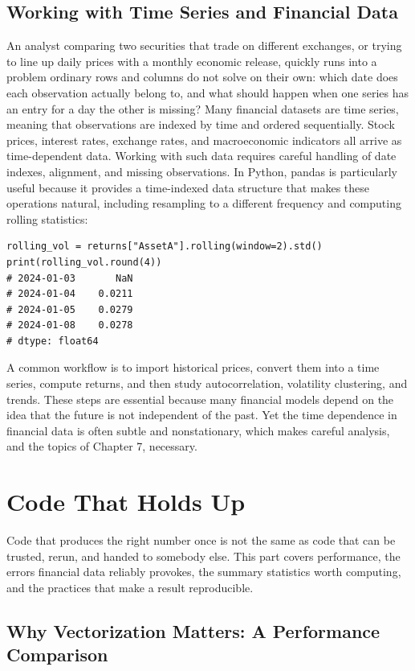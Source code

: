 \documentclass[../ai_in_finance]{subfiles}
\begin{document}
\subsection{Working with Time Series and Financial Data}

An analyst comparing two securities that trade on different exchanges, or trying to line up daily prices with a monthly economic release, quickly runs into a problem ordinary rows and columns do not solve on their own: which date does each observation actually belong to, and what should happen when one series has an entry for a day the other is missing? Many financial datasets are time series, meaning that observations are indexed by time and ordered sequentially. Stock prices, interest rates, exchange rates, and macroeconomic indicators all arrive as time-dependent data. Working with such data requires careful handling of date indexes, alignment, and missing observations. In Python, pandas is particularly useful because it provides a time-indexed data structure that makes these operations natural, including resampling to a different frequency and computing rolling statistics:

\begin{verbatim}
rolling_vol = returns["AssetA"].rolling(window=2).std()
print(rolling_vol.round(4))
# 2024-01-03       NaN
# 2024-01-04    0.0211
# 2024-01-05    0.0279
# 2024-01-08    0.0278
# dtype: float64
\end{verbatim}

A common workflow is to import historical prices, convert them into a time series, compute returns, and then study autocorrelation, volatility clustering, and trends. These steps are essential because many financial models depend on the idea that the future is not independent of the past. Yet the time dependence in financial data is often subtle and nonstationary, which makes careful analysis, and the topics of Chapter 7, necessary.

\section{Code That Holds Up}

Code that produces the right number once is not the same as code that can be trusted, rerun, and handed to somebody else. This part covers performance, the errors financial data reliably provokes, the summary statistics worth computing, and the practices that make a result reproducible.

\subsection{Why Vectorization Matters: A Performance Comparison}
\label{sec:vectorization-performance}
\end{document}
